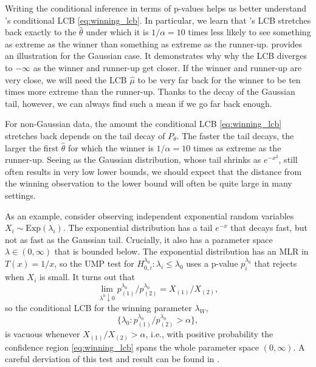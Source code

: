 \documentclass{article}
\begin{document}
Writing the conditional inference in terms of p-values helps us better understand \cite{Fithian2017}'s conditional LCB \eqref{eq:winning_lcb}. In particular, we learn that 's LCB stretches back exactly to the $\hat{\theta}$ under which it is $1/\alpha = 10$ times less likely to see something as extreme as the winner than something as extreme as the runner-up.  provides an illustration for the Gaussian case. It demonstrates why why the LCB diverges to $-\infty$ as the winner and runner-up get closer. If the winner and runner-up are very close, we will need the LCB $\hat{\mu}$ to be very far back for the winner to be ten times more extreme than the runner-up. Thanks to the decay of the Gaussian tail, however, we can always find such a mean if we go far back enough. 

For non-Gaussian data, the amount the conditional LCB \eqref{eq:winning_lcb} stretches back depends on the tail decay of $P_{\theta}$. The faster the tail decays, the larger the first $\hat{\theta}$ for which the winner is $1/\alpha = 10$ times as extreme as the runner-up. Seeing as the Gaussian distribution, whose tail shrinks as $e^{-x^2}$, still often results in very low lower bounds, we should expect that the distance from the winning observation to the lower bound will often be quite large in many settings.  

As an example, consider observing independent exponential random variables $X_i \sim \text{Exp}(\lambda_i)$. The exponential distribution has a tail $e^{-x}$ that decays fast, but not as fast as the Gaussian tail. Crucially, it also has a parameter space $\lambda \in (0, \infty)$ that is bounded below. The exponential distribution has an MLR in $T(x) = 1/x$, so the UMP test for $H^{\lambda_0}_{0, i}: \lambda_i \leq \lambda_0$ uses a p-value $p^{\lambda_0}_i$ that rejects when $X_i$ is small. It turns out that 
\begin{equation*}
    \lim_{\lambda^0 \downarrow 0} p^{\lambda_0}_{(1)}/p^{\lambda_0}_{(2)} = X_{(1)}/X_{(2)},
\end{equation*}   
so the conditional LCB for the winning parameter $\lambda_W$,
\begin{equation}
\label{eq:exp_winning_lcb}
 \{\lambda_0 : p^{\lambda_0}_{(1)}/p^{\lambda_0}_{(2)}  > \alpha\},
\end{equation}
is vacuous whenever $X_{(1)}/X_{(2)} > \alpha$, i.e., with positive probability the confidence region \eqref{eq:winning_lcb} spans the whole parameter space $(0, \infty)$. A careful derviation of this test and result can be found in . 
\end{document}

